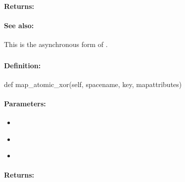 \paragraph{Returns:}


\paragraph{See also:}  This is the asynchronous form of .

\pagebreak
\subsubsection{}
\label{api:python:map_atomic_xor}


\paragraph{Definition:}
\begin{pythoncode}
def map_atomic_xor(self, spacename, key, mapattributes)
\end{pythoncode}

\paragraph{Parameters:}
\begin{itemize}[noitemsep]
\item {}\\

\item {}\\

\item {}\\

\end{itemize}

\paragraph{Returns:}


\pagebreak
\subsubsection{}
\label{api:python:async_map_atomic_xor}


